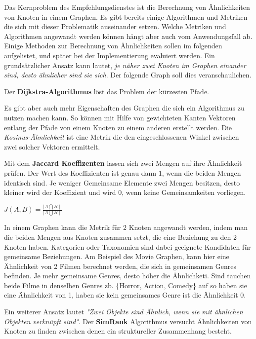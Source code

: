 Das Kernproblem des Empfehlungsdienstes ist die Berechnung von Ähnlichkeiten von Knoten in einem Graphen. Es gibt bereits einige Algorithmen und Metriken die sich mit dieser Problematik auseinander setzen. Welche Metriken und Algorithmen angewandt werden können hängt aber auch vom Anwendungsfall ab. Einige Methoden zur Berechnung von Ähnlichkeiten sollen im folgenden aufgelistet, und später bei der Implementierung evaluiert werden. Ein grundsätzlicher Ansatz kann lautet,\textit{ je näher zwei Knoten im Graphen einander sind, desto ähnlicher sind sie sich}. Der folgende Graph soll dies veranschaulichen. 

Der \textbf{Dijkstra-Algorithmus} löst das Problem der kürzesten Pfade.

Es gibt aber auch mehr Eigenschaften des Graphen die sich ein Algorithmus zu nutzen machen kann. So können mit Hilfe von gewichteten Kanten Vektoren entlang der Pfade von einem Knoten zu einem anderen erstellt werden. Die \textit{Kosinus-Ähnlichkeit} ist eine Metrik die den eingeschlossenen Winkel zwischen zwei solcher Vektoren ermittelt.
\vspace{1em}

Mit dem \textbf{Jaccard Koeffizenten} lassen sich zwei Mengen auf ihre Ähnlichkeit prüfen. Der Wert des Koeffizienten ist  genau dann 1, wenn die beiden Mengen identisch sind. Je weniger Gemeinsame Elemente zwei Mengen besitzen, desto kleiner wird der  Koeffizient und wird 0, wenn keine Gemeinsamkeiten vorliegen.
\begin{center}
	$ J(A,B)=\frac{\mid A\bigcap B\mid }{ \mid A \bigcup B \mid }$

\end{center}
In einem Graphen kann die Metrik für 2 Knoten angewandt werden, indem man die beiden Mengen aus Knoten zusammen setzt, die eine Beziehung zu den 2 Knoten haben. Kategorien oder Taxonomien sind dabei geeignete Kandidaten für gemeinsame Beziehungen. Am Beispiel des Movie Graphen, kann hier eine Ähnlichkeit von 2 Filmen berechnet werden, die sich in gemeinsamen Genres befinden. Je mehr gemeinsame Genres, desto höher die Ähnlichketi. Sind tauchen beide Filme in denselben Genres zb. \{Horror, Action, Comedy\} auf so haben sie eine Ähnlichkeit von 1, haben sie kein gemeinsames Genre ist die Ähnlichkeit 0.
\vspace{1em}

Ein weiterer Ansatz lautet \textit{"Zwei Objekte sind Ähnlich, wenn sie mit ähnlichen Objekten verknüpft sind"}. Der \textbf{SimRank} \cite{Jeh:2002:SMS:775047.775126} Algorithmus versucht Ähnlichkeiten von Knoten zu finden zwischen denen ein struktureller Zusammenhang besteht. 
\vspace{1em}

